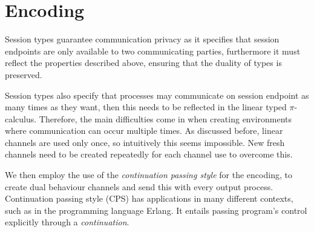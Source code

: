\section{Encoding} \label{Encoding}

Session types guarantee communication privacy as it specifies that session endpoints are only available to two communicating parties, furthermore it must reflect the properties described above, ensuring that the duality of types is preserved. 

Session types also specify that processes may communicate on session endpoint as many times as they want, then this needs to be reflected in the linear typed $\pi$-calculus. Therefore, the main difficulties come in when creating environments where communication can occur multiple times. As discussed before, linear channels are used only once, so intuitively this seems impossible. New fresh channels need to be created repeatedly for each channel use to overcome this. 

We then employ the use of the \textit{continuation passing style} for the encoding, to create dual behaviour channels and send this with every output process. Continuation passing style (CPS) has applications in many different contexts, such as in the programming language Erlang. It entails passing program's control explicitly through a \textit{continuation}. 


